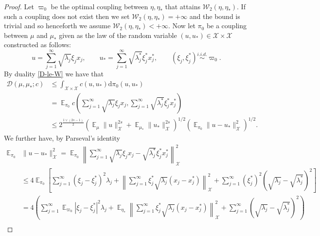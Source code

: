 \documentclass[final]{siamart171218}
\newcommand{\mcl}{\mathcal}
\newcommand{\dd}{\text{d}}
\newcommand{\mX}{\mcl{X}}
\DeclareMathOperator{\E}{\mathbb E}
\newcommand{\K}{\mathcal{D}}
\newcommand{\W}{\mathcal{W}}
\newcommand{\iidsim}{\stackrel{i.i.d.}{\sim}}
\begin{document}
\begin{proof}
  Let $\varpi_0$ be the optimal coupling between $\eta, \eta_\ast$ that attains
  $\W_2(\eta, \eta_\ast)$. If such a coupling does not exist then we set $\W_2(\eta, \eta_\ast) = +\infty$
  and the bound is trivial and so henceforth we assume $\W_2(\eta,  \eta_\ast) < +\infty$. 
  Now let $\pi_0$ be a coupling between $\mu$ and $\mu_\ast$ given as the law
  of the random variable $(u, u_\ast) \in \mX \times \mX$  constructed as follows:
  \begin{equation*}
    u = \sum_{j=1}^\infty \sqrt{\lambda_j} \xi_j x_j, \qquad u_\ast =
    \sum_{j=1}^\infty \sqrt{\lambda^\ast_j} \xi^\ast_j
 x^\ast_j, \qquad (\xi_j, \xi_j^\ast) \iidsim \varpi_0.
\end{equation*}
By  duality \eqref{D-le-W} we have that
\begin{equation*}
  \begin{aligned}
  \K(\mu, \mu_\ast; c)
  & \le \int_{\mX \times \mX} c(u,u_\ast) \dd \pi_0(u, u_\ast)\\
  & = \E_{\pi_0} c \left( \sum_{j=1}^\infty \sqrt{\lambda_j} \xi_j x_j,
    \sum_{j=1}^\infty \sqrt{\lambda^\ast_j} \xi^\ast_j x^\ast_j \right) \\
  & \le 2^{\frac{1 \vee (2s-1)}{2}} \left( \E_\mu\| u\|_\mX^{2s} + \E_{\mu_\ast} \| u_\ast \|_\mX^{2s} \right)^{1/2}
  \left( \E_{\pi_0} \| u - u_\ast \|_\mX^2 \right)^{1/2}.
\end{aligned}
\end{equation*}
We further have, by Parseval's identity
\begin{equation*}
  \begin{aligned}
    \E_{\pi_0} & \| u - u_\ast \|_\mX^2
     =  \E_{\pi_0}  \left\| \sum_{j=1}^\infty  \sqrt{\lambda_j} \xi_j x_j - \sqrt{\lambda_j^\ast} \xi_j^\ast
        x_j^\ast  \right\|_\mX^2   \\
      & \le 4  \E_{\pi_0} \left[ \sum_{j=1}^\infty ( \xi_j- \xi_j^\ast)^2 \lambda_j
        +   \left\| \sum_{j=1}^\infty \xi^\ast_j \sqrt{\lambda_j}  \left(  x_j - x_j^\ast \right) \right\|_\mX^2
        + \sum_{j=1}^\infty (\xi^\ast_j)^2 \left( \sqrt{\lambda_j}  - \sqrt{\lambda_j^\ast} \right)^2   \right]  \\
      & = 4  \left( \sum_{j=1}^\infty \E_{\varpi_0} | \xi_j - \xi_j^\ast|^2 \lambda_j
      +  \E_{\eta_\ast}   \left\| \sum_{j=1}^\infty \xi^\ast_j \sqrt{\lambda_j}  \left(  x_j - x_j^\ast \right) \right\|_\mX^2
    +   \sum_{j=1}^ \infty (\sqrt{\lambda_j} - \sqrt{\lambda_j^\ast})^2 \right) \\

\end{aligned}
\end{equation*}
\end{proof}
\end{document}
